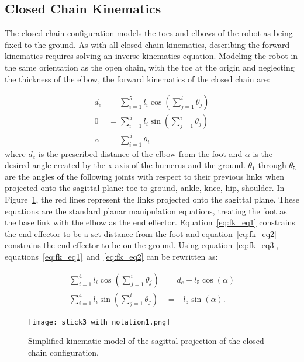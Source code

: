 \subsection{Closed Chain Kinematics} \label{subsec:crawl_closed_chain}

The closed chain configuration models the toes and elbows of the robot as being fixed to the ground.
As with all closed chain kinematics, describing the forward kinematics requires solving an inverse
kinematics equation. Modeling the robot in the same orientation as the open chain, with the toe at the origin
and neglecting the thickness of the elbow,
the forward kinematics of the closed chain are:

\begin{align}
	d_e &= \sum_{i=1}^5 l_i \cos(\sum_{j=1}^i \theta_j) \label{eq:fk_eq1}\\
	0 &= \sum_{i=1}^5 l_i \sin(\sum_{j=1}^i \theta_j) \label{eq:fk_eq2} \\
	\alpha &=\sum_{i=1}^5 \theta_i \label{eq:fk_eq3}
\end{align}
where $d_e$ is the prescribed distance of the elbow from the foot and $\alpha$ is the desired angle
created by the x-axis of the humerus and the ground.
$\theta_1$ through $\theta_5$ are the angles of the following joints with respect to their previous links when projected onto the sagittal plane:
toe-to-ground, ankle, knee, hip, shoulder. In Figure~\ref{fig:pp_stick1}, the red lines represent the links projected onto the sagittal plane.
These equations are the standard planar manipulation equations, treating the foot as the base link 
with the elbow as the end effector.
Equation~\ref{eq:fk_eq1} constrains the end effector to be a set distance from the foot and 
equation~\ref{eq:fk_eq2} constrains the end effector to be on the ground.
Using equation~\ref{eq:fk_eq3}, equations~\ref{eq:fk_eq1}~and~\ref{eq:fk_eq2} can be rewritten as:

\begin{align}
\sum_{i=1}^4 l_i \cos(\sum_{j=1}^i \theta_j) &= d_e - l_5 \cos(\alpha) \label{eq:sum_cos1} \\
\sum_{i=1}^4 l_i \sin(\sum_{j=1}^i \theta_j) &= - l_5 \sin(\alpha). \label{eq:sum_sin1}
\end{align}

\begin{figure}
	\centering
	\texttt{[image: stick3\_with\_notation1.png]}
	\caption
	{Simplified kinematic model of the sagittal projection of the closed chain configuration.}
	\label{fig:pp_stick1}
\end{figure}

